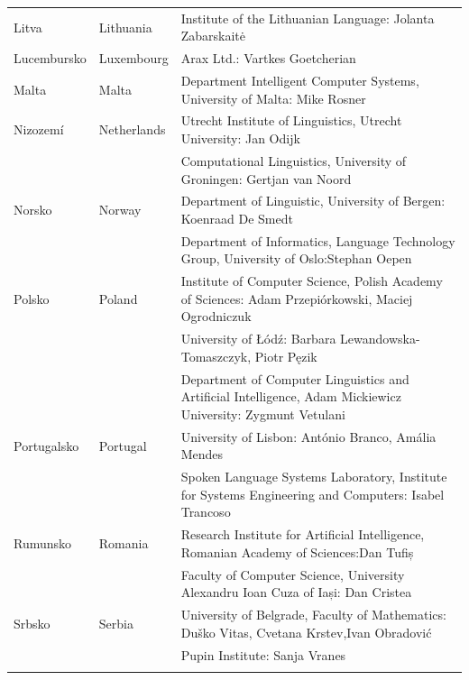 \documentclass[]{../../metanetpaper}
\begin{document}
\begin{longtable}{@{}llp{113mm}@{}}
  Litva & \textcolor{grey1}{Lithuania} & Institute of the Lithuanian Language: Jolanta Zabarskaitė\\ \addlinespace
  Lucembursko & \textcolor{grey1}{Luxembourg} & Arax Ltd.: Vartkes Goetcherian\\ \addlinespace
  Malta & \textcolor{grey1}{Malta} & Department Intelligent Computer Systems, University of Malta: Mike Rosner\\ \addlinespace
  Nizozemí & \textcolor{grey1}{Netherlands} & Utrecht Institute of Linguistics, Utrecht University: Jan Odijk\\ \addlinespace 
  & & Computational Linguistics, University of Groningen: Gertjan van Noord\\ \addlinespace
  Norsko & \textcolor{grey1}{Norway} & Department of Linguistic, University of Bergen: Koenraad De Smedt\\ \addlinespace 
  & & Department of Informatics, Language Technology Group, University of Oslo:\newline Stephan Oepen \\ \addlinespace
  Polsko & \textcolor{grey1}{Poland} & Institute of Computer Science, Polish Academy of Sciences: Adam Przepiórkowski, Maciej Ogrodniczuk \\ \addlinespace
  & & University of Łódź: Barbara Lewandowska-Tomaszczyk, Piotr Pęzik\\ \addlinespace
  & & Department of Computer Linguistics and Artificial Intelligence, Adam Mickiewicz University: Zygmunt Vetulani \\ \addlinespace
  Portugalsko & \textcolor{grey1}{Portugal} & University of Lisbon: António Branco, Amália Mendes \\ \addlinespace
  & & Spoken Language Systems Laboratory, Institute for Systems Engineering and Computers: Isabel Trancoso \\ \addlinespace
  Rumunsko & \textcolor{grey1}{Romania} & Research Institute for Artificial Intelligence, Romanian Academy of Sciences:\newline Dan Tufiș \\ \addlinespace
  & & Faculty of Computer Science, University Alexandru Ioan Cuza of Iași: Dan Cristea \\ \addlinespace
  Srbsko & \textcolor{grey1}{Serbia} & University of Belgrade, Faculty of Mathematics: Duško Vitas, Cvetana Krstev,\newline Ivan Obradović \\ \addlinespace
  & & Pupin Institute: Sanja Vranes \\ \addlinespace

\end{longtable}
\end{document}
